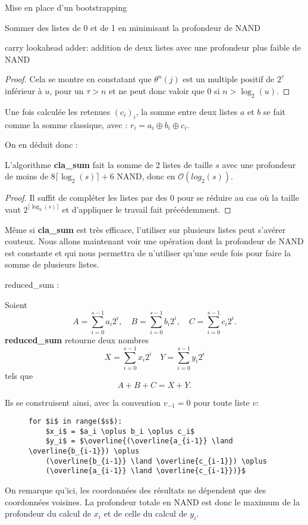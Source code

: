 \begin{section}{Mise en place d'un bootstrapping}
\begin{subsection}{Sommer des listes de 0 et de 1 en minimisant la profondeur de NAND}
\begin{subsubsection}{carry lookahead adder: addition de deux listes avec une profondeur plus faible de NAND}
\begin{proof}
Cela se montre en constatant que $\theta^n(j)$ est un multiple positif de $2^\tau$ inférieur à $u$, pour un 
$\tau > n$ et ne peut donc valoir que 0 si $n > \log_2(u)$.
\end{proof}

	Une fois calculée les retenues $(c_i)_i$, la somme entre deux listes $a$ et $b$ se fait comme la somme classique, avec : $r_i = a_i \oplus b_i \oplus c_i$.

	On en déduit donc :

\begin{thm}
\label{cla_sum}
	L'algorithme \textbf{cla\_sum} fait la somme de 2 listes de taille $s$ avec une profondeur de moins de $8 \lceil \log_2(s) \rceil + 6$ NAND, donc en $\mathcal{O}(log_2(s))$.
\end{thm}

\begin{proof}
	Il suffit de compléter les listes par des 0 pour se réduire au cas où la taille vaut $2^{\lceil \log_2(s) \rceil}$ et d'appliquer le travail fait précédemment.
\end{proof}
\end{subsubsection}

Même si \textbf{cla\_sum} est très efficace, l'utiliser sur plusieurs listes peut s'avérer couteux.
Nous allons maintenant voir une opération dont la profondeur de NAND est constante et qui nous permettra
de n'utiliser  qu'une seule fois pour faire la somme de plusieurs listes.

\begin{subsubsection}{reduced\_sum :}

	Soient
\[A = \sum_{i=0}^{s-1} a_i 2^i, \quad B = \sum_{i=0}^{s-1} b_i 2^i, \quad C = \sum_{i=0}^{s-1} c_i 2^i. \]
\textbf{reduced\_sum} retourne deux nombres 
\[X = \sum_{i=0}^{s-1} x_i 2^i \quad Y = \sum_{i=0}^{s-1} y_i 2^i \] 
tels que 
\[A + B + C = X + Y.\]

Ils se construisent ainsi, avec la convention $v_{-1} = 0 $ pour toute liste $v$:
\begin{figure}[!h]
\begin{lstlisting}
for $i$ in range($s$):
	$x_i$ = $a_i \oplus b_i \oplus c_i$
	$y_i$ = $\overline{(\overline{a_{i-1}} \land \overline{b_{i-1}}) \oplus
	(\overline{b_{i-1}} \land \overline{c_{i-1}}) \oplus
	(\overline{a_{i-1}} \land \overline{c_{i-1}})}$
\end{lstlisting}
\end{figure}

	On remarque qu'ici, les coordonnées des résultats ne dépendent que des coordonnées voisines. La profondeur
	totale en NAND est donc le maximum de la profondeur du calcul de $x_i$ et de celle du calcul de $y_i$.


\end{subsubsection}
\end{subsection}
\end{section}
